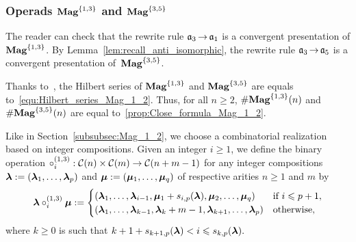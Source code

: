 \subsubsection{Operads $\mathbf{Mag}^{\{1, 3\}}$ and $\mathbf{Mag}^{\{3, 5\}}$}
The reader can check that the rewrite rule $\mathfrak{a}_3 \operatorname{\to} \mathfrak{a}_1$ is a
convergent presentation of $\mathbf{Mag}^{\{1, 3\}}$. By
Lemma~\ref{lem:recall_anti_isomorphic}, the rewrite rule
$\mathfrak{a}_3 \operatorname{\to} \mathfrak{a}_5$ is a convergent presentation of~$\mathbf{Mag}^{\{3, 5\}}$.
\medbreak

Thanks to~\cite{Gir18}, the Hilbert series of $\mathbf{Mag}^{\{1, 3\}}$ and
$\mathbf{Mag}^{\{3, 5\}}$ are equals to~\eqref{equ:Hilbert_series_Mag_1_2}. Thus,
for all $n \geq 2$,
$\# \mathbf{Mag}^{\{1, 3\}}(n)$ and $\# \mathbf{Mag}^{\{3, 5\}}(n)$ are
equal to~\eqref{prop:Close_formula_Mag_1_2}.
\medbreak

Like in Section~\ref{subsubsec:Mag_1_2}, we choose a combinatorial
realization based on integer compositions.
Given an integer $i \geq 1$, we define the binary operation
\begin{math}
    \circ_i^{(1,3)} : \mathcal{C}(n) \times \mathcal{C}(m)
    \to\mathcal{C}(n + m - 1)
\end{math}
for any integer compositions
$\bm{\lambda} := \left(\bm{\lambda}_1, \dots, \bm{\lambda}_p\right)$ and
$\bm{\mu} := \left(\bm{\mu}_1, \dots, \bm{\mu}_q\right)$ of respective arities
$n \geq 1$ and $m$ by
\begin{equation}
    \bm{\lambda} \circ_i^{(1,3)} \bm{\mu} :=
    \begin{cases}
        \left(\bm{\lambda}_1, \dots, \bm{\lambda}_{i - 1},
        \bm{\mu}_1 + s_{i, p}(\bm{\lambda}), \bm{\mu}_2, \dots, \bm{\mu}_q\right) &
        \mbox{if } i \leqslant p + 1, \\
        \left(\bm{\lambda}_1, \dots, \bm{\lambda}_{k - 1},
        \bm{\lambda}_k + m - 1,
        \bm{\lambda}_{k + 1}, \dots, \bm{\lambda}_p\right)
            & \mbox{otherwise},
    \end{cases}
\end{equation}
where $k \geq 0$ is such that
\begin{math}
    k + 1 + s_{k + 1, p}(\bm{\lambda}) < i \leqslant s_{k, p}(\bm{\lambda}).
\end{math}
\medbreak

